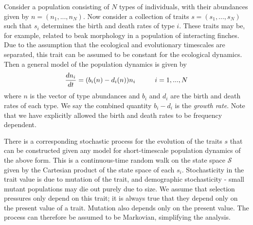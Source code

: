 Consider a population consisting of $N$ types of individuals, with their abundances given by $n = (n_1, ..., n_N)$. 
Now consider a collection of traits $s = (s_1, ..., s_N)$ such that $s_i$ determines the birth and death rates of type $i$. 
These traits may be, for example, related to beak morphology in a population of interacting finches.
Due to the assumption that the ecological and evolutionary timescales are separated, this trait can be assumed to be constant for the ecological dynamics.  Then a general model of the population dynamics is given by 
\begin{align}
	\frac{dn_i}{dt} = (b_i(n) - d_i(n))  n_i \hspace{10mm} i = 1, ... , N
	\label{eqn:bi-di-eqn-form}
\end{align} 
where $n$ is the vector of type abundances and $b_i$ and $d_i$ are the birth and death rates of each type. 
We say the combined quantity $b_i-d_i$ is the \textit{growth rate}. 
Note that we have explicitly allowed the birth and death rates to be frequency dependent.

There is a corresponding stochastic process for the evolution of the traits $s$ that can be constructed given any model for short-timescale population dynamics of the above form. 
This is a continuous-time random walk on the state space $\mathcal{S}$ given by the Cartesian product of the state space of each $s_i$. 
Stochasticity in the trait value is due to mutation of the trait, and demographic stochasticity - small mutant populations may die out purely due to size. 
We assume that selection pressures only depend on this trait; it is always true that they depend only on the present value of a trait.
Mutation also depends only on the present value. 
The process can therefore be assumed to be Markovian, simplifying the analysis.


